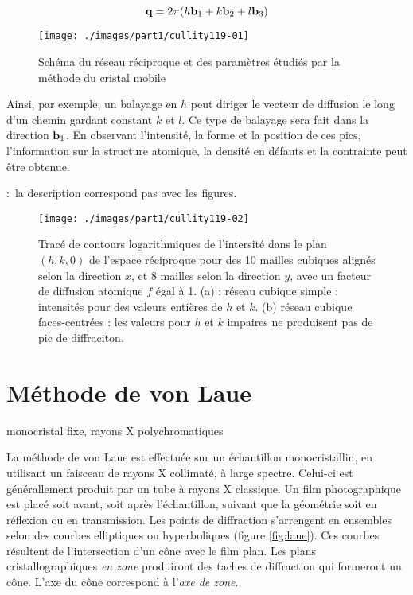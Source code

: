 \begin{equation}
    \mathbf{q} = 2\pi (h\mathbf{b}_1 + k\mathbf{b}_2 + l\mathbf{b}_3)
\end{equation}

\begin{figure}
    \texttt{[image: ./images/part1/cullity119-01]}
    \caption{Schéma du réseau réciproque et des paramètres étudiés par la méthode du cristal mobile}
    \label{fig:cristalmobilerecip}
\end{figure}

Ainsi, par exemple, un balayage en $h$ peut diriger le vecteur de diffusion le long d'un chemin gardant constant $k$ et $l$. Ce type de balayage sera fait dans la direction $\mathbf{b}_1$. En observant l'intensité, la forme et la position de ces pics, l'information sur la structure atomique, la densité en défauts et la contrainte peut être obtenue.


\TODO : la description correspond pas avec les figures.
\begin{figure}
    \texttt{[image: ./images/part1/cullity119-02]}
    \caption{Tracé de contours logarithmiques de l'intersité dans le plan $(h,k,0)$ de l'espace réciproque pour des 10 mailles cubiques alignés selon la direction $x$, et 8 mailles selon la direction $y$, avec un facteur de diffusion atomique $f$ égal à 1. (a) : réseau cubique simple : intensités pour des valeurs entières de $h$ et $k$. (b) réseau cubique faces-centrées : les valeurs pour $h$ et $k$ impaires ne produisent pas de pic de diffraciton.}
    \label{fig:cristalmobilecubic}
\end{figure}

\section{Méthode de von Laue}
monocristal fixe, rayons X polychromatiques

La méthode de von Laue est effectuée sur un échantillon monocristallin, en utilisant un faisceau de rayons X collimaté, à large spectre. Celui-ci est générallement produit par un tube à rayons X classique. Un film photographique est placé soit avant, soit après l'échantillon, suivant que la géométrie soit en réflexion ou en transmission. Les points de diffraction s'arrengent en ensembles selon des courbes elliptiques ou hyperboliques (figure \ref{fig:laue}). Ces courbes résultent de l'intersection d'un cône avec le film plan. Les plans cristallographiques \emph{en zone} produiront des taches de diffraction qui formeront un cône. L'axe du cône correspond à l'\emph{axe de zone}.

